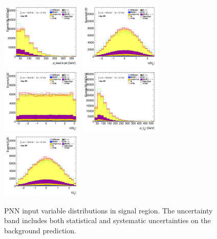 		\begin{figure}[!htp]
			\begin{center}    
			\includegraphics[width=0.35\textwidth]{chapters/chapter6_HPlus/images/taulep/bjet_0_pt_SR_TAULEP.png}
			\includegraphics[width=0.35\textwidth]{chapters/chapter6_HPlus/images/taulep/bjet_0_eta_SR_TAULEP.png} \\
			\includegraphics[width=0.35\textwidth]{chapters/chapter6_HPlus/images/taulep/bjet_0_phi_SR_TAULEP.png}
			\includegraphics[width=0.35\textwidth]{chapters/chapter6_HPlus/images/taulep/jet_0_pt_SR_TAULEP.png} \\
			\includegraphics[width=0.35\textwidth]{chapters/chapter6_HPlus/images/taulep/jet_0_eta_SR_TAULEP.png} 
			\end{center}
			\caption{
			PNN input variable distributions in \taulep signal region. The uncertainty band includes both statistical and systematic uncertainties on the background prediction. 
			}
			\label{fig:sr-taulep-2}
		\end{figure}

